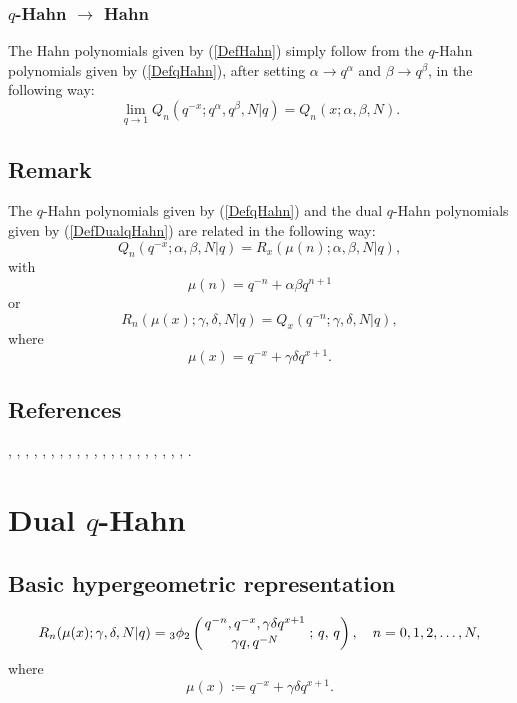 \documentclass[envcountchap,graybox]{svmono}
\newcounter{rom}
\newcommand{\qhyp}[5]{\mbox{}_{#1}{\phi}_{#2}
\left(\genfrac{}{}{0pt}{}{#3}{#4}\,;\,q,\,#5\right)}
\begin{document}
\subsubsection*{$q$-Hahn $\rightarrow$ Hahn}
The Hahn polynomials given by (\ref{DefHahn}) simply follow from the $q$-Hahn
polynomials given by (\ref{DefqHahn}), after setting $\alpha\rightarrow q^{\alpha}$
and $\beta\rightarrow q^{\beta}$, in the following way:
\begin{equation}
\lim_{q\rightarrow 1}Q_n(q^{-x};q^{\alpha},q^{\beta},N|q)=Q_n(x;\alpha,\beta,N).
\end{equation}

\subsection*{Remark}
The $q$-Hahn polynomials given by (\ref{DefqHahn}) and the dual $q$-Hahn
polynomials given by (\ref{DefDualqHahn}) are related in the following way:
$$Q_n(q^{-x};\alpha,\beta,N|q)=R_x(\mu(n);\alpha,\beta,N|q),$$
with
$$\mu(n)=q^{-n}+\alpha\beta q^{n+1}$$
or
$$R_n(\mu(x);\gamma,\delta,N|q)=Q_x(q^{-n};\gamma,\delta,N|q),$$
where
$$\mu(x)=q^{-x}+\gamma\delta q^{x+1}.$$

\subsection*{References}
\cite{AlSalam90}, \cite{AlvarezRonveaux}, \cite{AndrewsAskey85},
\cite{AskeyWilson79}, \cite{AskeyWilson85}, \cite{AtakRahmanSuslov},
\cite{Dunkl78II}, \cite{Fischer95}, \cite{GasperRahman84},
\cite{GasperRahman90}, \cite{Hahn}, \cite{KalninsMiller88},
\cite{Koelink96I}, \cite{KoelinkKoorn}, \cite{Koorn89III}, \cite{Koorn90II},
\cite{Nikiforov+}, \cite{NoumiMimachi90II}, \cite{Rahman82},
\cite{Stanton80II}, \cite{Stanton84}, \cite{Stanton90}.


\section{Dual $q$-Hahn}
\par\setcounter{equation}{0}

\subsection*{Basic hypergeometric representation}
\begin{equation}
\label{DefDualqHahn}
R_n(\mu(x);\gamma,\delta,N|q)=
\qhyp{3}{2}{q^{-n},q^{-x},\gamma\delta q^{x+1}}{\gamma q,q^{-N}}{q},\quad n=0,1,2,\ldots,N,
\end{equation}
where
$$\mu(x):=q^{-x}+\gamma\delta q^{x+1}.$$
\end{document}
